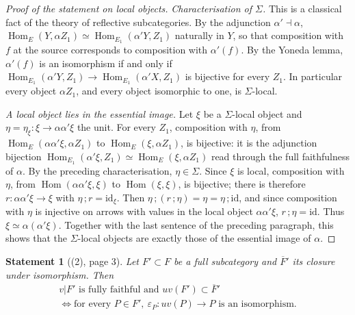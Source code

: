 \documentclass[11pt]{article}
\theoremstyle{plain}
\newtheorem*{enonce}{Statement}
\theoremstyle{definition}
\theoremstyle{remark}
\begin{document}
\begin{proof}[Proof of the statement on local objects]
\emph{Characterisation of $\Sigma$.} This is a classical fact of the theory of reflective subcategories. By the adjunction $\alpha' \dashv \alpha$, $\operatorname{Hom}_E(Y, \alpha Z_1) \simeq \operatorname{Hom}_{E_1}(\alpha' Y, Z_1)$ naturally in $Y$, so that composition with $f$ at the source corresponds to composition with $\alpha'(f)$. By the Yoneda lemma, $\alpha'(f)$ is an isomorphism if and only if $\operatorname{Hom}_{E_1}(\alpha' Y, Z_1) \to \operatorname{Hom}_{E_1}(\alpha' X, Z_1)$ is bijective for every $Z_1$. In particular every object $\alpha Z_1$, and every object isomorphic to one, is $\Sigma$-local.

\emph{A local object lies in the essential image.} Let $\xi$ be a $\Sigma$-local object and $\eta = \eta_\xi : \xi \to \alpha\alpha'\xi$ the unit. For every $Z_1$, composition with $\eta$, from $\operatorname{Hom}_E(\alpha\alpha'\xi, \alpha Z_1)$ to $\operatorname{Hom}_E(\xi, \alpha Z_1)$, is bijective: it is the adjunction bijection $\operatorname{Hom}_{E_1}(\alpha'\xi, Z_1) \simeq \operatorname{Hom}_E(\xi, \alpha Z_1)$ read through the full faithfulness of $\alpha$. By the preceding characterisation, $\eta \in \Sigma$. Since $\xi$ is local, composition with $\eta$, from $\operatorname{Hom}(\alpha\alpha'\xi, \xi)$ to $\operatorname{Hom}(\xi, \xi)$, is bijective; there is therefore $r : \alpha\alpha'\xi \to \xi$ with $\eta\,;r = \mathrm{id}_\xi$. Then $\eta\,;(r\,;\eta) = \eta = \eta\,;\mathrm{id}$, and since composition with $\eta$ is injective on arrows with values in the local object $\alpha\alpha'\xi$, $r\,;\eta = \mathrm{id}$. Thus $\xi \simeq \alpha(\alpha'\xi)$. Together with the last sentence of the preceding paragraph, this shows that the $\Sigma$-local objects are exactly those of the essential image of $\alpha$.
\end{proof}

\begin{enonce}[(2), page 3]
Let $F' \subset F$ be a full subcategory and $\overline{F}'$ its closure under isomorphism. Then
\[
  \begin{gathered}
  v|F' \text{ is fully faithful and } uv(F') \subset \overline{F}' \\
  \iff \text{for every } P \in F',\ \varepsilon_P : uv(P) \to P \text{ is an isomorphism.}
  \end{gathered}
\]
\end{enonce}
\end{document}
